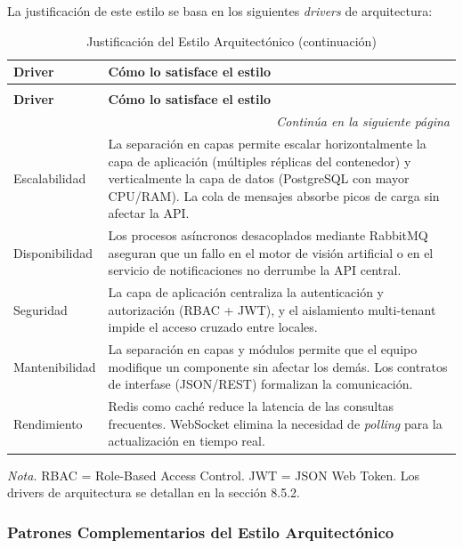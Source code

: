 La justificación de este estilo se basa en los siguientes \textit{drivers} de arquitectura:

\begin{longtable}{p{3cm} p{11cm}}
\caption{Justificación del Estilo Arquitectónico} \\
\toprule
\textbf{Driver} & \textbf{Cómo lo satisface el estilo} \\
\midrule
\endfirsthead

\caption[]{Justificación del Estilo Arquitectónico (continuación)} \\
\toprule
\textbf{Driver} & \textbf{Cómo lo satisface el estilo} \\
\midrule
\endhead

\midrule
\multicolumn{2}{r}{\footnotesize\textit{Continúa en la siguiente página}} \\
\endfoot

\bottomrule
\endlastfoot

Escalabilidad & La separación en capas permite escalar horizontalmente la capa de aplicación (múltiples réplicas del contenedor) y verticalmente la capa de datos (PostgreSQL con mayor CPU/RAM). La cola de mensajes absorbe picos de carga sin afectar la API. \\
\midrule
Disponibilidad & Los procesos asíncronos desacoplados mediante RabbitMQ aseguran que un fallo en el motor de visión artificial o en el servicio de notificaciones no derrumbe la API central. \\
\midrule
Seguridad & La capa de aplicación centraliza la autenticación y autorización (RBAC + JWT), y el aislamiento multi-tenant impide el acceso cruzado entre locales. \\
\midrule
Mantenibilidad & La separación en capas y módulos permite que el equipo modifique un componente sin afectar los demás. Los contratos de interfase (JSON/REST) formalizan la comunicación. \\
\midrule
Rendimiento & Redis como caché reduce la latencia de las consultas frecuentes. WebSocket elimina la necesidad de \textit{polling} para la actualización en tiempo real. \\
\end{longtable}

\textit{Nota.} RBAC = Role-Based Access Control. JWT = JSON Web Token. Los drivers de arquitectura se detallan en la sección 8.5.2.

\newpage\subsubsection{Patrones Complementarios del Estilo Arquitectónico}

